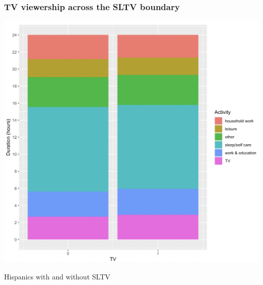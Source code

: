 \documentclass{beamer}
\begin{document}
\begin{frame}
\frametitle{TV viewership across the SLTV boundary} \label{atus_breakdown}

\begin{center}
\includegraphics[width=.75\textwidth]{../../analysis/Output/graphs/time_breakdown.png}\\
\end{center}
\vspace{-5pt}
\footnotesize Hispanics with and without SLTV \hyperlink{atus_time}{}

\end{frame}
\end{document}
